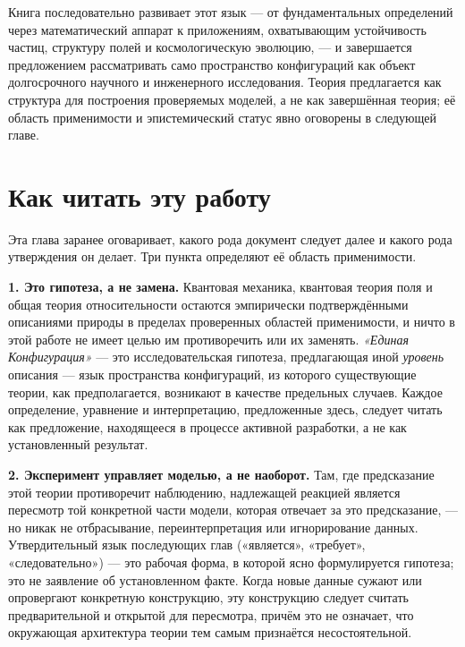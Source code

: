 \documentclass[11pt,oneside]{book}
\begin{document}
Книга последовательно развивает этот язык — от фундаментальных определений через математический аппарат к приложениям, охватывающим устойчивость частиц, структуру полей и космологическую эволюцию, — и завершается предложением рассматривать само пространство конфигураций как объект долгосрочного научного и инженерного исследования. Теория предлагается как структура для построения проверяемых моделей, а не как завершённая теория; её область применимости и эпистемический статус явно оговорены в следующей главе.

\chapter*{Как читать эту работу}

Эта глава заранее оговаривает, какого рода документ следует далее и какого рода утверждения он делает. Три пункта определяют её область применимости.

\bigskip
\noindent\textbf{1. Это гипотеза, а не замена.}
Квантовая механика, квантовая теория поля и общая теория относительности остаются эмпирически подтверждёнными описаниями природы в пределах проверенных областей применимости, и ничто в этой работе не имеет целью им противоречить или их заменять. \emph{«Единая Конфигурация»} — это исследовательская гипотеза, предлагающая иной \emph{уровень} описания — язык пространства конфигураций, из которого существующие теории, как предполагается, возникают в качестве предельных случаев. Каждое определение, уравнение и интерпретацию, предложенные здесь, следует читать как предложение, находящееся в процессе активной разработки, а не как установленный результат.

\bigskip
\noindent\textbf{2. Эксперимент управляет моделью, а не наоборот.}
Там, где предсказание этой теории противоречит наблюдению, надлежащей реакцией является пересмотр той конкретной части модели, которая отвечает за это предсказание, — но никак не отбрасывание, переинтерпретация или игнорирование данных. Утвердительный язык последующих глав («является», «требует», «следовательно») — это рабочая форма, в которой ясно формулируется гипотеза; это не заявление об установленном факте. Когда новые данные сужают или опровергают конкретную конструкцию, эту конструкцию следует считать предварительной и открытой для пересмотра, причём это не означает, что окружающая архитектура теории тем самым признаётся несостоятельной.
\end{document}
